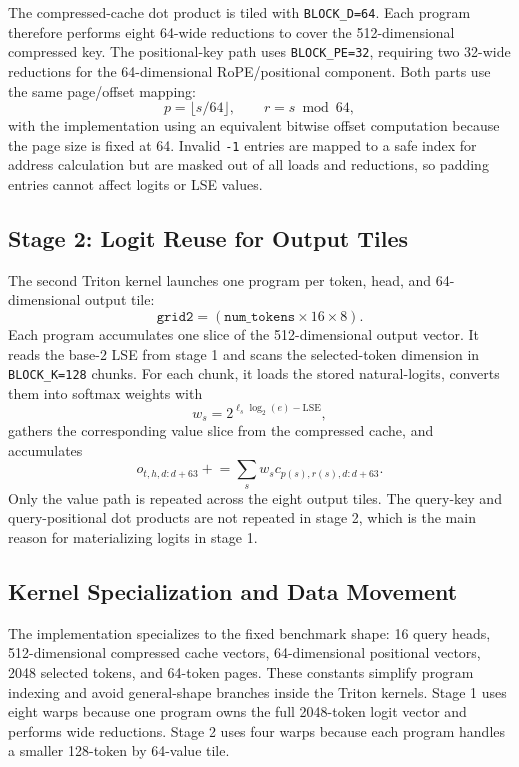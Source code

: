 \documentclass{article}
\begin{document}
The compressed-cache dot product is tiled with \texttt{BLOCK\_D=64}. Each program
therefore performs eight 64-wide reductions to cover the 512-dimensional compressed
key. The positional-key path uses \texttt{BLOCK\_PE=32}, requiring two 32-wide
reductions for the 64-dimensional RoPE/positional component. Both parts use the same
page/offset mapping:
\[
p=\lfloor s/64\rfloor,\qquad r=s\bmod 64,
\]
with the implementation using an equivalent bitwise offset computation because the page
size is fixed at 64. Invalid \texttt{-1} entries are mapped to a safe index for address
calculation but are masked out of all loads and reductions, so padding entries cannot
affect logits or LSE values.

\subsection{Stage 2: Logit Reuse for Output Tiles}

The second Triton kernel launches one program per token, head, and 64-dimensional output
tile:
\[
\texttt{grid2}=(\texttt{num\_tokens}\times 16\times 8).
\]
Each program accumulates one slice of the 512-dimensional output vector. It reads the
base-2 LSE from stage 1 and scans the selected-token dimension in \texttt{BLOCK\_K=128}
chunks. For each chunk, it loads the stored natural-logits, converts them into softmax
weights with
\[
w_s = 2^{\ell_s\log_2(e)-\mathrm{LSE}},
\]
gathers the corresponding value slice from the compressed cache, and accumulates
\[
o_{t,h,d:d+63} \mathrel{+}= \sum_s w_s c_{p(s),r(s),d:d+63}.
\]
Only the value path is repeated across the eight output tiles. The query-key and
query-positional dot products are not repeated in stage 2, which is the main reason for
materializing logits in stage 1.

\subsection{Kernel Specialization and Data Movement}

The implementation specializes to the fixed benchmark shape: 16 query heads,
512-dimensional compressed cache vectors, 64-dimensional positional vectors, 2048
selected tokens, and 64-token pages. These constants simplify program indexing and
avoid general-shape branches inside the Triton kernels. Stage 1 uses eight warps because
one program owns the full 2048-token logit vector and performs wide reductions. Stage 2
uses four warps because each program handles a smaller 128-token by 64-value tile.
\end{document}
